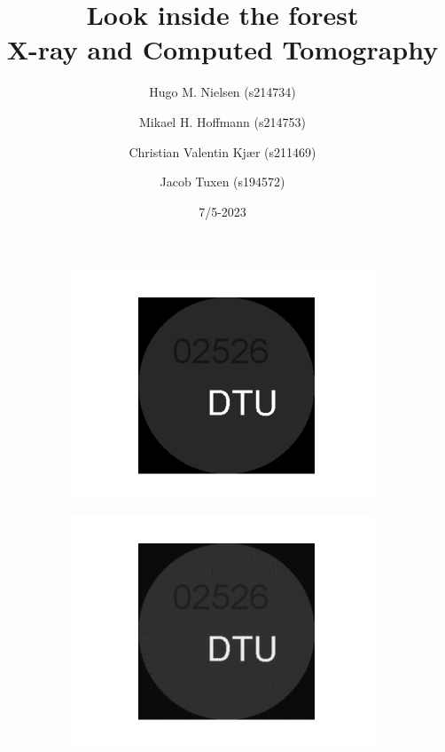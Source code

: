 \documentclass{article}
\title{
    Look inside the forest \\
    \large X-ray and Computed Tomography
}
\author{Hugo M. Nielsen (s214734) \and Mikael H. Hoffmann (s214753) \and Christian Valentin Kjær (s211469) \and Jacob Tuxen (s194572)}
\date{7/5-2023}
\begin{document}
\maketitle\thispagestyle{empty}

\begin{figure}[H]
\centering
\begin{subfigure}[t]{0.3\linewidth}
\centering
\includegraphics[width=\linewidth]{code/test_logo.png}
\end{subfigure}
\begin{subfigure}[t]{0.4\linewidth}
\centering
\includegraphics[width=\linewidth]{code/test_logo_recov.png}
\end{subfigure}
\begin{subfigure}[t]{0.5\linewidth}

\end{subfigure}
\end{figure}
\end{document}

